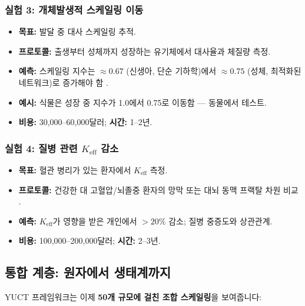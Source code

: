 \documentclass[11pt,a4paper]{article}
\newcommand{\Keff}{K_{\mathrm{eff}}}
\begin{document}
	\subsubsection{실험 3: 개체발생적 스케일링 이동}
	\begin{itemize}
		\item \textbf{목표:} 발달 중 대사 스케일링 추적.
		\item \textbf{프로토콜:} 출생부터 성체까지 성장하는 유기체에서 대사율과 체질량 측정.
		\item \textbf{예측:} 스케일링 지수는 \(\approx 0.67\) (신생아, 단순 기하학)에서 \(\approx 0.75\) (성체, 최적화된 네트워크)로 증가해야 함 \cite{Glazier2005}.
		\item \textbf{예시:} 식물은 성장 중 지수가 1.0에서 0.75로 이동함 \cite{Reich2006} — 동물에서 테스트.
		\item \textbf{비용:} 30,000–60,000달러; \textbf{시간:} 1–2년.
	\end{itemize}
	
	\subsubsection{실험 4: 질병 관련 \(\Keff\) 감소}
	\begin{itemize}
		\item \textbf{목표:} 혈관 병리가 있는 환자에서 \(\Keff\) 측정.
		\item \textbf{프로토콜:} 건강한 대 고혈압/뇌졸중 환자의 망막 또는 대뇌 동맥 프랙탈 차원 비교 \cite{Gould1993}.
		\item \textbf{예측:} \(\Keff\)가 영향을 받은 개인에서 \(>20\%\) 감소; 질병 중증도와 상관관계.
		\item \textbf{비용:} 100,000–200,000달러; \textbf{시간:} 2–3년.
	\end{itemize}
	
	\subsection{통합 계층: 원자에서 생태계까지}
	
	YUCT 프레임워크는 이제 \textbf{50개 규모에 걸친 조합 스케일링}을 보여줍니다:
	
\end{document}
